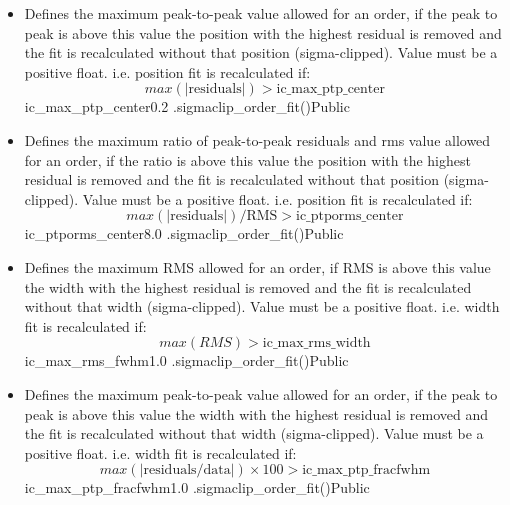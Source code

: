 \begin{itemize}
\item {}
{Defines the maximum peak-to-peak value allowed for an order, if the peak to peak is above this value the position with the highest residual is removed and the fit is recalculated without that position (sigma-clipped). Value must be a positive float.
\vspace{0.5cm}
i.e. position fit is recalculated if: 
\begin{equation}
max(|\text{residuals}|) > \text{ic\_max\_ptp\_center}
\end{equation}
}
{ic\_max\_ptp\_center}{0.2}
{\callocRAW}{\constantsfile}{\spirouLOCOR.sigmaclip\_order\_fit()}{Public}


\item {}
{Defines the maximum ratio of peak-to-peak residuals and rms value allowed for an order, if the ratio is above this value the position with the highest residual is removed and the fit is recalculated without that position (sigma-clipped). Value must be a positive float.
\vspace{0.5cm}
i.e. position fit is recalculated if: 
\begin{equation}
max(|\text{residuals}|)/\text{RMS} > \text{ic\_ptporms\_center}
\end{equation}
}
{ic\_ptporms\_center}{8.0}
{\callocRAW}{\constantsfile}{\spirouLOCOR.sigmaclip\_order\_fit()}{Public}


\item {}
{Defines the maximum RMS allowed for an order, if RMS is above this value the width with the highest residual is removed and the fit is recalculated without that width (sigma-clipped). Value must be a positive float.
\vspace{0.5cm}
i.e. width fit is recalculated if: 
\begin{equation}
max(RMS) > \text{ic\_max\_rms\_width}
\end{equation}
}
{ic\_max\_rms\_fwhm}{1.0}
{\callocRAW}{\constantsfile}{\spirouLOCOR.sigmaclip\_order\_fit()}{Public}


\item {}
{Defines the maximum peak-to-peak value allowed for an order, if the peak to peak is above this value the width with the highest residual is removed and the fit is recalculated without that width (sigma-clipped). Value must be a positive float.
\vspace{0.5cm}
i.e. width fit is recalculated if: 
\begin{equation}
max(|\text{residuals/data}|)\times100 > \text{ic\_max\_ptp\_fracfwhm}
\end{equation}
}
{ic\_max\_ptp\_fracfwhm}{1.0}
{\callocRAW}{\constantsfile}{\spirouLOCOR.sigmaclip\_order\_fit()}{Public}



\end{itemize}
